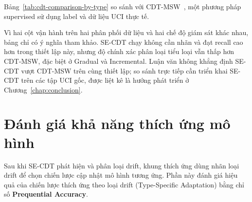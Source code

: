 Bảng~\ref{tab:cdt-comparison-by-type} so sánh với CDT-MSW~\cite{guo2022cdtmsw}, một phương pháp supervised sử dụng label và dữ liệu UCI thực tế.

\begin{table}[H]
	\centering
	\caption[So sánh phân loại CDT-MSW vs SE-CDT]{So sánh độ chính xác phân loại theo từng loại drift giữa CDT-MSW (Guo et al.~2022) và SE-CDT. Đây là đối chiếu tham khảo, không phải so sánh đồng điều kiện: CDT-MSW chạy có giám sát trên 10 tập UCI thực tế với ACC$_\text{subcat}$ tính có điều kiện trên các drift được phát hiện và phân nhóm đúng; SE-CDT chạy không giám sát trên 6 kịch bản Gaussian 5-D (Mục~\ref{sec:classification-setup}) với SUB tính trên toàn bộ ground truth. Cần lưu ý thêm rằng ``EDR'' trong~\cite{guo2022cdtmsw} viết tắt cho \textit{Error Detection Rate} (càng thấp càng tốt), khác hẳn với ``EDR'' được dùng trong luận văn (\textit{Event Detection Rate}, tương đương Recall), nên hai chỉ số trùng tên này không so sánh trực tiếp được với nhau.}
	\label{tab:cdt-comparison-by-type}
	
\end{table}

Vì hai cột vận hành trên hai phân phối dữ liệu và hai chế độ giám sát khác nhau, bảng chỉ có ý nghĩa tham khảo. SE-CDT chạy không cần nhãn và đạt recall cao hơn trong thiết lập này, nhưng độ chính xác phân loại tiểu loại vẫn thấp hơn CDT-MSW, đặc biệt ở Gradual và Incremental. Luận văn không khẳng định SE-CDT vượt CDT-MSW trên cùng thiết lập; so sánh trực tiếp cần triển khai SE-CDT trên các tập UCI gốc, được liệt kê là hướng phát triển ở Chương~\ref{chap:conclusion}.

\section{Đánh giá khả năng thích ứng mô hình}
\label{sec:adaptation-eval}

Sau khi SE-CDT phát hiện và phân loại drift, khung thích ứng dùng nhãn loại drift để chọn chiến lược cập nhật mô hình tương ứng. Phần này đánh giá hiệu quả của chiến lược thích ứng theo loại drift (Type-Specific Adaptation) bằng chỉ số \textbf{Prequential Accuracy}.

